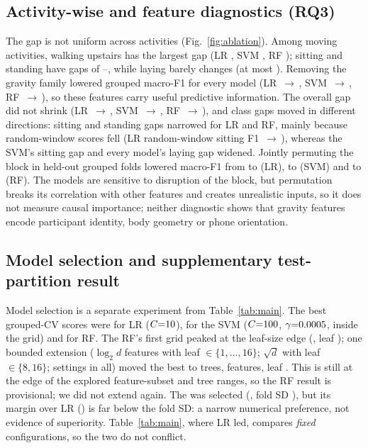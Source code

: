 \documentclass{article}
\begin{document}
\subsection{Activity-wise and feature diagnostics (RQ3)}
The gap is not uniform across activities (Fig.~\ref{fig:ablation}). Among moving activities, walking upstairs has the largest gap (LR \NdropLRUpstairs, SVM \NdropSVMUpstairs, RF \NdropRFUpstairs); sitting and standing have gaps of \NdropSVMStand--\NdropRFSit, while laying barely changes (at most \NdropLRLay).
Removing the gravity family lowered grouped macro-F1 for every model (LR \NablLRMacroPfull{}\,$\to$\,\NablLRMacroPng, SVM \NablSVMMacroPfull{}\,$\to$\,\NablSVMMacroPng, RF \NablRFMacroPfull{}\,$\to$\,\NablRFMacroPng), so these features carry useful predictive information. The overall gap did not shrink (LR \NablLRMacrofull{}\,$\to$\,\NablLRMacrong, SVM \NablSVMMacrofull{}\,$\to$\,\NablSVMMacrong, RF \NablRFMacrofull{}\,$\to$\,\NablRFMacrong), and class gaps moved in different directions: sitting and standing gaps narrowed for LR and RF, mainly because random-window scores fell (LR random-window sitting F1 \NablLRSitRfull{}\,$\to$\,\NablLRSitRng), whereas the SVM's sitting gap and every model's laying gap widened. Jointly permuting the block in held-out grouped folds lowered macro-F1 from \NpermLRbase{} to \NpermLR{} (LR), \NpermSVMbase{} to \NpermSVM{} (SVM) and \NpermRFbase{} to \NpermRF{} (RF). The models are sensitive to disruption of the block, but permutation breaks its correlation with other features and creates unrealistic inputs, so it does not measure causal importance; neither diagnostic shows that gravity features encode participant identity, body geometry or phone orientation.

\subsection{Model selection and supplementary test-partition result}
\label{sec:select}
Model selection is a separate experiment from Table~\ref{tab:main}. The best grouped-CV scores were \NtuneLR{} for LR ($C{=}10$), \NtuneSVM{} for the SVM ($C{=}100$, $\gamma{=}0.0005$, inside the grid) and \NtuneRF{} for RF. The RF's first grid peaked at the leaf-size edge (\NtuneRFone, leaf \NtuneRFoneleaf); one bounded extension ($\log_2 d$ features with leaf $\in\{1,\dots,16\}$; $\sqrt{d}$ with leaf $\in\{8,16\}$; \NtuneRFn{} settings in all) moved the best to \NtuneRFtrees{} trees, \NtuneRFmf{} features, leaf \NtuneRFleaf. This is still at the edge of the explored feature-subset and tree ranges, so the RF result is provisional; we did not extend again. The \Nselmodel{} was selected (\Nselcv, fold SD \Nselcvsd), but its margin over LR (\Nselmargin) is far below the fold SD: a narrow numerical preference, not evidence of superiority. Table~\ref{tab:main}, where LR led, compares \emph{fixed} configurations, so the two do not conflict.
\end{document}
